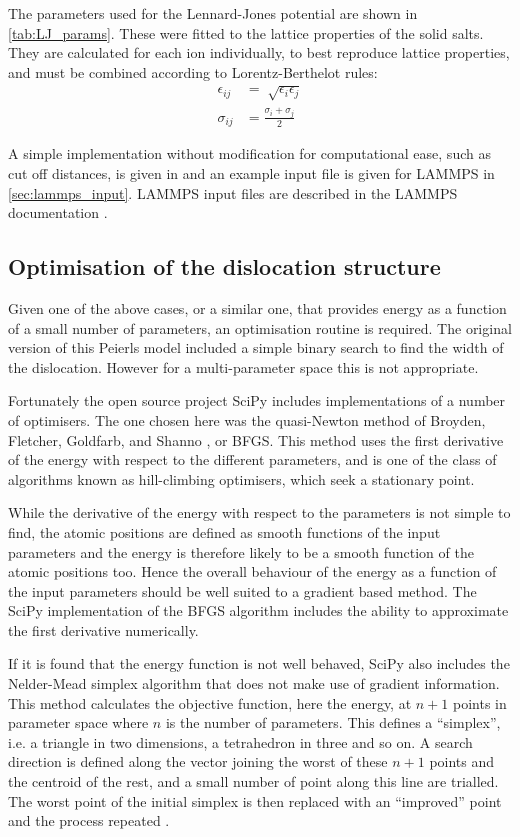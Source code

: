 The parameters used for the Lennard-Jones potential are shown in \autoref{tab:LJ_params}. These were fitted to the lattice properties of the solid salts. They are calculated for each ion individually, to best reproduce lattice properties, and must be combined according to Lorentz-Berthelot rules:
\begin{align}
\epsilon_{ij} &= \sqrt[]{\epsilon_i \epsilon_j} \nonumber\\
\sigma_{ij} &= \frac{\sigma_i + \sigma_j}{2}
\end{align}

A simple implementation without modification for computational ease, such as cut off distances, is given in \cite{code} and an example input file is given for LAMMPS in \autoref{sec:lammps_input}. LAMMPS  input files are described in the LAMMPS documentation \cite{LAMMPS_web}.

\FloatBarrier
\subsection{Optimisation of the dislocation structure}
\label{sec:optimisers}


Given one of the above cases, or a similar one, that provides energy as a function of a small number of parameters, an optimisation routine is required. The original version of this Peierls model \cite{Clegg2006} included a simple binary search to find the width of the dislocation. However for a multi-parameter space this is not appropriate.

Fortunately the open source project SciPy includes implementations of a number of optimisers. The one chosen here was the quasi-Newton method of Broyden, Fletcher, Goldfarb, and Shanno \citep{SciPy2001,nocedal2006}, or BFGS. This method uses the first derivative of the energy with respect to the different parameters, and is one of the class of algorithms known as hill-climbing optimisers, which seek a stationary point.

While the derivative of the energy with respect to the parameters is not simple to find, the atomic positions are defined as smooth functions of the input parameters and the energy is therefore likely to be a smooth function of the atomic positions too. Hence the overall behaviour of the energy as a function of the input parameters should be well suited to a gradient based method. The SciPy implementation of the BFGS algorithm includes the ability to approximate the first derivative numerically.

If it is found that the energy function is not well behaved, SciPy also includes the Nelder-Mead simplex algorithm that does not make use of gradient information. This method calculates the objective function, here the energy, at $n+1$ points in parameter space where $n$ is the number of parameters. This defines a ``simplex'', i.e. a triangle in two dimensions, a tetrahedron in three and so on. A search direction is defined along the vector joining the worst of these $n+1$ points and the centroid of the rest, and a small number of point along this line are trialled. The worst point of the initial simplex is then replaced with an ``improved'' point and the process repeated \citep{Nelder1965,Gao2012}.


